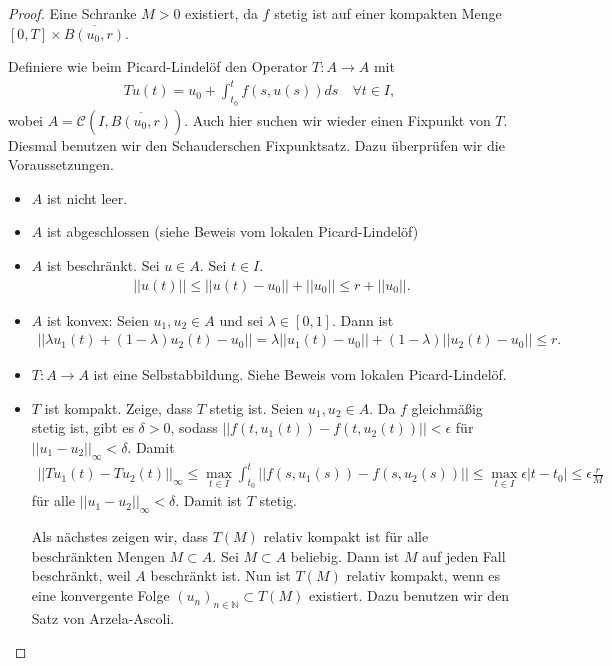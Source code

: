 \documentclass[a4paper]{article}
\theoremstyle{definition}
\begin{document}
\begin{proof}
Eine Schranke $M>0$ existiert, da $f$ stetig ist auf einer kompakten Menge $[0,T] \times\overline{ B(u_0,r)}$.

Definiere wie beim Picard-Lindelöf den Operator $T:A \to A$ mit
\begin{align*}
    Tu(t) = u_0 + \int^t_{t_0} f(s,u(s)) ds \quad \forall t \in I,
\end{align*}
wobei $A = \mathcal{C}(I,\overline{ B(u_0,r)})$. Auch hier suchen wir wieder einen Fixpunkt von $T$. Diesmal benutzen wir den Schauderschen Fixpunktsatz. Dazu überprüfen wir die Voraussetzungen.
\begin{itemize}
    \item $A$ ist nicht leer.
    \item $A$ ist abgeschlossen (siehe Beweis vom lokalen Picard-Lindelöf)
    \item $A$ ist beschränkt. Sei $u \in A$. Sei $t \in I$.
    \begin{align*}
        ||u(t)|| \leq ||u(t) - u_0|| + ||u_0|| \leq r + ||u_0||.
    \end{align*}
    \item $A$ ist konvex: Seien $u_1, u_2 \in A$ und sei $\lambda \in [0,1]$. Dann ist 
    \begin{align*}
        ||\lambda u_1(t) + (1-\lambda)u_2(t) - u_0|| = \lambda||u_1(t) - u_0|| + (1-\lambda)||u_2(t) - u_0|| \leq r.
    \end{align*}
    \item $T: A \to A$ ist eine Selbstabbildung. Siehe Beweis vom lokalen Picard-Lindelöf.
    \item $T$ ist kompakt. Zeige, dass $T$ stetig ist. Seien $u_1, u_2 \in A$. Da $f$ gleichmäßig stetig ist, gibt es $\delta > 0$, sodass $||f(t, u_1(t)) - f(t,u_2(t))|| < \epsilon$ für $||u_1 - u_2||_\infty < \delta$. Damit 
    \begin{align*}
        ||Tu_1(t) - Tu_2(t)||_\infty \leq \max_{t \in I}\int^t_{t_0}||f(s,u_1(s)) - f(s,u_2(s))|| \leq\max_{t \in I} \epsilon |t-t_0| \leq \epsilon \frac{r}{M}
    \end{align*}
    für alle $||u_1 - u_2||_\infty < \delta$. Damit ist $T$ stetig.

    Als nächstes zeigen wir, dass $T(M)$ relativ kompakt ist für alle beschränkten Mengen $M \subset A$. Sei $M \subset A$ beliebig. Dann ist $M$ auf jeden Fall beschränkt, weil $A$ beschränkt ist. Nun ist $T(M)$ relativ kompakt, wenn es eine konvergente Folge $(u_n)_{n \in \mathbb{N}} \subset T(M)$ existiert. Dazu benutzen wir den Satz von Arzela-Ascoli. 


\end{itemize}
\end{proof}
\end{document}
